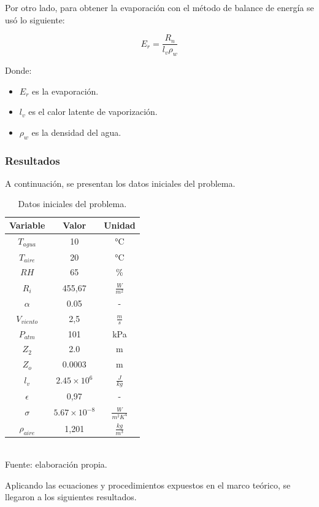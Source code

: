 \documentclass{article}  %
\begin{document}
Por otro lado, para obtener la evaporación con el método de balance de energía se usó lo siguiente:

\begin{equation}
  E_r = \frac{R_n}{l_v \rho_w}
\end{equation}

Donde:

\begin{itemize}
  \item $E_r$ es la evaporación.
  \item $l_v$ es el calor latente de vaporización.
  \item $\rho_w$ es la densidad del agua.
\end{itemize}

\subsubsection{Resultados}

A continuación, se presentan los datos iniciales del problema.

\begin{table}[H]
  \centering
  \caption{Datos iniciales del problema.}
  \begin{tabular}{|c|c|c|}
    \hline
    \textbf{Variable} & \textbf{Valor} & \textbf{Unidad}\\
    \hline
    $T_{agua}$ & 10 & °C\\
    $T_{aire}$ & 20 & °C\\
    $RH$ & 65 & \%\\
    $R_i$ & 455,67 & $\frac{W}{m^2}$\\
    $\alpha$ & 0.05 & - \\
    $V_{viento}$ & 2,5 & $\frac{m}{s}$\\
    $P_{atm}$ & 101 & kPa\\
    $Z_2$ & 2.0 & m\\
    $Z_o$ & 0.0003 & m\\
    $l_v$ & $2.45 \times 10^6$ & $\frac{J}{kg}$\\
    $\epsilon$ & 0,97 & -\\
    $\sigma$ & $5.67 \times 10^{-8}$ & $\frac{W}{m^2K^4}$\\
    $\rho_{aire}$ & 1,201 & $\frac{kg}{m^3}$\\
    \hline
  \end{tabular}
  \\ Fuente: elaboración propia.
\end{table}

Aplicando las ecuaciones y procedimientos expuestos en el marco teórico, se llegaron a los siguientes resultados.
\end{document}
